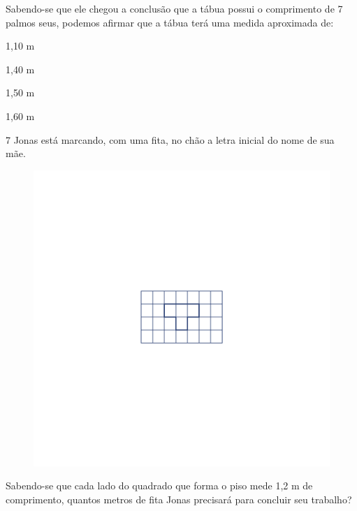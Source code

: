 Sabendo-se que ele chegou a conclusão que a tábua possui o comprimento
de 7 palmos seus, podemos afirmar que a tábua terá uma medida aproximada
de:

\begin{escolha}
\item
  1,10 m
\item
  1,40 m
\item
  1,50 m
\item
  1,60 m
\end{escolha}


\num{7} Jonas está marcando, com uma fita, no chão a letra inicial do nome
de sua mãe.

\begin{figure}[htpb!]
\includegraphics[width=\textwidth]{../ilustracoes/MAT5/SAEB_5ANO_MAT_figura118.png}
\end{figure}

Sabendo-se que cada lado do quadrado que forma o piso mede 1,2 m de
comprimento, quantos metros de fita Jonas precisará para concluir seu
trabalho?

